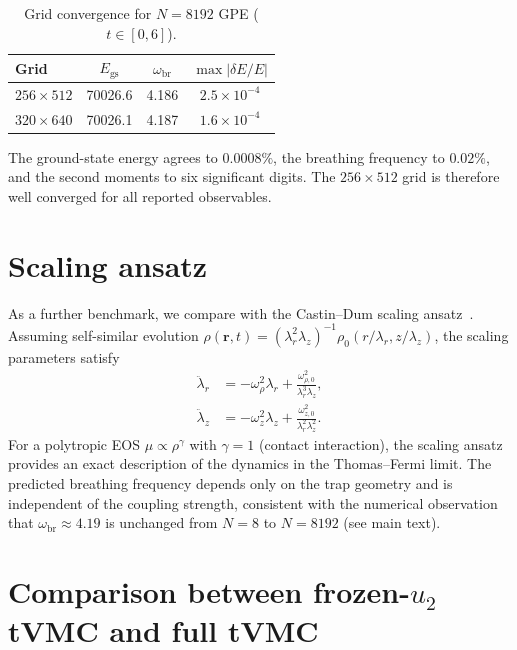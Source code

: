 \documentclass[aps,prl,onecolumn,superscriptaddress,longbibliography,nofootinbib]{revtex4-2}
\newcommand{\br}{\mathbf{r}}
\begin{document}
\begin{table}[h]
\caption{Grid convergence for $N=8192$ GPE ($t\in[0,6]$).}
\label{tab:conv_8192}
\begin{ruledtabular}
\begin{tabular}{lccc}
Grid & $E_{\mathrm{gs}}$ & $\omega_{\mathrm{br}}$ & $\max|\delta E/E|$\\
\hline
$256\times 512$ & 70026.6 & 4.186 & $2.5\times10^{-4}$\\
$320\times 640$ & 70026.1 & 4.187 & $1.6\times10^{-4}$\\
\end{tabular}
\end{ruledtabular}
\end{table}

The ground-state energy agrees to $0.0008\%$, the breathing frequency
to $0.02\%$, and the second moments to six significant digits.  The
$256\times 512$ grid is therefore well converged for all reported
observables.

\section{Scaling ansatz}
\label{sec:scaling}

As a further benchmark, we compare with the Castin--Dum scaling
ansatz~\cite{CastinDum1996,Kagan1996}.  Assuming self-similar evolution
$\rho(\br,t) = (\lambda_r^2\lambda_z)^{-1}
\rho_0(r/\lambda_r,z/\lambda_z)$, the scaling parameters satisfy
\begin{align}
\ddot\lambda_r &= -\omega_\rho^2\lambda_r
+ \frac{\omega_{\rho,0}^2}{\lambda_r^3\lambda_z},\\
\ddot\lambda_z &= -\omega_z^2\lambda_z
+ \frac{\omega_{z,0}^2}{\lambda_r^2\lambda_z^2}.
\end{align}
For a polytropic EOS $\mu\propto\rho^\gamma$ with $\gamma=1$
(contact interaction), the scaling ansatz provides an exact description
of the dynamics in the Thomas--Fermi limit.  The predicted breathing
frequency depends only on the trap geometry and is independent of the
coupling strength, consistent with the numerical observation that
$\omega_{\mathrm{br}}\approx 4.19$ is unchanged from $N=8$ to
$N=8192$ (see main text).

\section{Comparison between frozen-$u_2$ tVMC and full tVMC}
\label{sec:full_vs_frozen}
\end{document}

